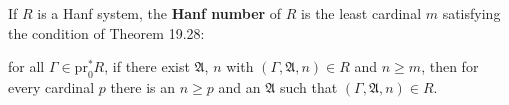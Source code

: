 If $R$ is a Hanf system, the \textbf{Hanf number} of $R$ is the least cardinal $m$ satisfying the condition of Theorem 19.28:

for all $\Gamma \in \mathrm{pr}_0^* R$, if there exist $\mathfrak{A}$, $n$ with $(\Gamma, \mathfrak{A}, n) \in R$ and $n \geq m$, then for every cardinal $p$ there is an $n \geq p$ and an $\mathfrak{A}$ such that $(\Gamma, \mathfrak{A}, n) \in R$.

